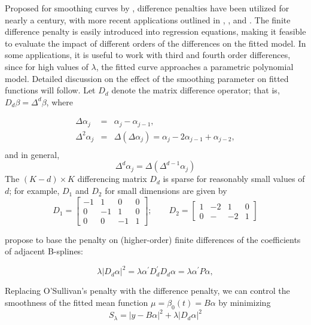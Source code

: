 \documentclass[12pt]{article}
\begin{document}
Proposed for smoothing curves by \cite{whittaker1922new}, difference penalties have been utilized for nearly a century, with more recent applications  outlined in  \cite{eilers1991penalized}, \cite{eilers1991nonparametric}, and \cite{eilers1995indirect}. The finite difference penalty is easily introduced into regression equations, making it feasible to evaluate the impact of different orders of the differences on the fitted model. In some applications, it is useful to work with third and fourth order differences, since for high values of $\lambda$, the fitted curve approaches a parametric polynomial model. Detailed discussion on the effect of the smoothing parameter on fitted functions will follow. Let $D_d$ denote the matrix difference operator; that is, $D_d\beta = \Delta^d \beta$, where

 \begin{eqnarray*}
 \Delta \alpha_j &=& \alpha_j - \alpha_{j-1},\\
 \Delta^2 \alpha_j &=& \Delta\left(\Delta \alpha_j\right) = \alpha_j - 2\alpha_{j-1} + \alpha_{j-2},\\ 
 \end{eqnarray*}
\noindent 
and in general,
\begin{equation*}
\Delta^d \alpha_j = \Delta\left(\Delta^{d-1} \alpha_j \right)
\end{equation*}
The $\left(K - d\right) \times K$ differencing matrix $D_d$ is sparse for reasonably small values of $d$; for example, $D_1$ and $D_2$ for small dimensions are given by 
\[
D_1 = \begin{bmatrix} -1&1&0&0\\ 0&-1&1&0\\ 0&0&-1&1 \end{bmatrix}; \qquad D_2 = \begin{bmatrix} 1&-2&1&0 \\ 0&-&-2&1\end{bmatrix}
\]

\cite{eilers1996flexible} propose to base the penalty on (higher-order) finite differences of the coefficients of adjacent B-splines:

 \[
 \lambda\vert D_d\alpha\vert^2 = \lambda \alpha^\prime D^\prime_d D_d \alpha = \lambda \alpha^\prime P\alpha,
 \] 



Replacing O'Sullivan's penalty with the difference penalty, we can control the smoothness of the fitted mean function $\mu = \beta_0\left( t \right) = B\alpha$ by minimizing
\begin{equation*} 
S_\lambda = \vert y- B \alpha \vert^2 + \lambda\vert D_d\alpha \vert^2
\end{equation*}
\end{document}
